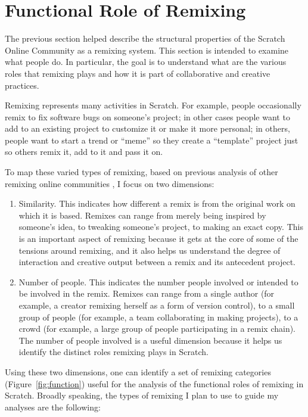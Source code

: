 \section{Functional Role of Remixing}

The previous section helped describe the structural properties of the Scratch Online Community as a remixing system.
This section is intended to examine what people do.
In particular, the goal is to understand what are the various roles that remixing plays and how it is part of collaborative and creative practices.

Remixing represents many activities in Scratch.
For example, people occasionally remix to fix software bugs on someone's project; in other cases people want to add to an existing project to customize it or make it more personal; in others, people want to start a trend or ``meme'' so they create a ``template'' project just so others remix it, add to it and pass it on.

To map these varied types of remixing, based on previous analysis of other remixing online communities \citep{seneviratne_remix_2010}, I focus on two dimensions:
\begin{enumerate}
\item{Similarity}. This indicates how different a remix is from the original work on which it is based. 
Remixes can range from merely being inspired by someone's idea, to tweaking someone's project, to making an exact copy.
This is an important aspect of remixing because it gets at the core of some of the tensions around remixing, and it also helps us understand the degree of interaction and creative output between a remix and its antecedent project.
\item{Number of people}. This indicates the number people involved or intended to be involved in the remix.
Remixes can range from a single author (for example, a creator remixing herself as a form of version control), to a small group of people (for example, a team collaborating in making projects), to a crowd (for example, a large group of people participating in a remix chain).
The number of people involved is a useful dimension because it helps us identify the distinct roles remixing plays in Scratch.
\end{enumerate}

Using these two dimensions, one can identify a set of remixing categories (Figure~\ref{fig:function}) useful for the analysis of the functional roles of remixing in Scratch.
Broadly speaking, the types of remixing I plan to use to guide my analyses are the following:

